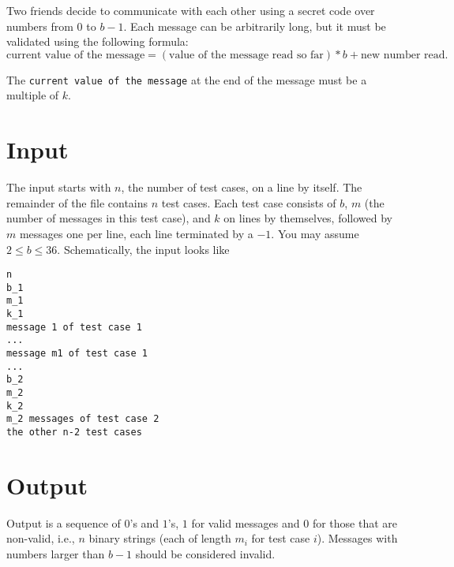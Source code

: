
Two friends decide to communicate with each other using a secret code over numbers from $0$ to $ b-1$.
Each message can be arbitrarily long, but it must be validated using the following formula:
\begin{displaymath}
\mbox{current value of the message} = 
 (\mbox{value of the message read so far})*b + 
 \mbox{new number read}.
\end{displaymath}

The {\tt current value of the message} at  the end of the message must be a multiple of $k$.

\section*{Input}

The input starts with $n$, the number of test cases, on a line by
itself.  The remainder of the file contains $n$ test cases.  Each test
case consists of $b$, $m$ (the number of messages in this test case),
and $k$ on lines by themselves, followed by $m$ messages one per line,
each line terminated by a $-1$.  You may assume $2 \leq b \leq 36$.
Schematically, the input looks like
\begin{verbatim}
n
b_1
m_1
k_1
message 1 of test case 1
...
message m1 of test case 1
...
b_2
m_2 
k_2
m_2 messages of test case 2
the other n-2 test cases
\end{verbatim}


\section*{Output}
Output is a sequence of $0$'s and $1$'s, $1$ for valid messages and
$0$ for those that are non-valid, i.e., $n$ binary strings (each of
length $m_i$ for test case $i$). Messages with numbers larger than $b-1$
should be considered invalid.
